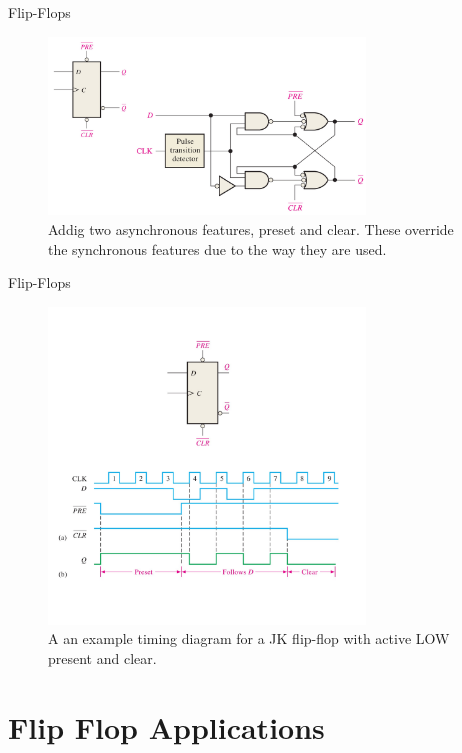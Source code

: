 \documentclass{beamer}
\begin{document}
\begin{frame}{Flip-Flops}
\begin{figure}
\centering
\includegraphics[width=0.75\textwidth]{figures/edge9.pdf}
\caption{\label{fig:ff9} Addig two asynchronous features, preset and clear.  These override the synchronous features due to the way they are used.}
\end{figure}
\end{frame}

\begin{frame}{Flip-Flops}
\begin{figure}
\centering
\includegraphics[width=0.75\textwidth]{figures/edge10.pdf}
\caption{\label{fig:ff10} A an example timing diagram for a JK flip-flop with active LOW present and clear.}
\end{figure}
\end{frame}

\section{Flip Flop Applications}
\end{document}
